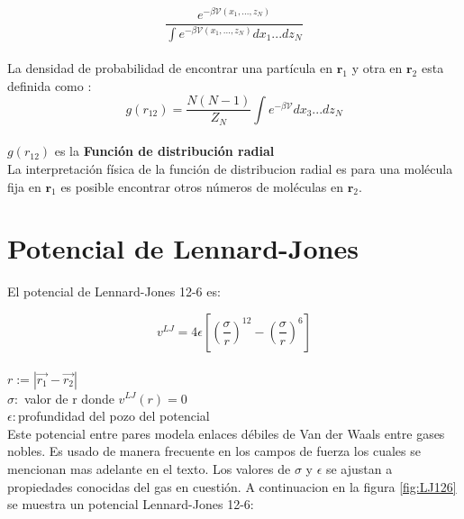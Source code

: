 \begin{equation}
    \frac{e^{-\beta \mathcal{V}(x_1,...,z_N)}}{\int e^{-\beta \mathcal{V}(x_1,...,z_N)}dx_1...dz_N}
\end{equation}\\

La densidad de probabilidad de encontrar una partícula en $\mathbf{r}_1$ y otra en $\mathbf{r}_2$ esta definida como \cite{feynman1972statistical}:\\

\begin{equation}
    g(r_{12}) = \frac{N(N-1)}{Z_N}
    \int e^{-\beta\mathcal{V}}dx_3...dz_N
\end{equation}\\

$g(r_{12})$ es la \textbf{Función de distribución radial}\\

La interpretación física de la función de distribucion radial es para una molécula fija en $\mathbf{r}_1$ es posible encontrar otros números de moléculas en $\mathbf{r}_2$.

\section{Potencial de Lennard-Jones}

El potencial de Lennard-Jones 12-6 es:

\begin{equation} \label{LJ12-6}
    v^{LJ} = 4\epsilon \left[ \left(\frac{\sigma}{r} \right)^{12}-\left(\frac{\sigma}{r} \right)^{6}\right]
\end{equation}\\

$r:= |\vec{r_1}-\vec{r_2}|$\\

$\sigma: $ valor de r donde $v^{LJ}(r)=0$\\

$\epsilon : $profundidad del pozo del potencial\\

Este potencial entre pares modela enlaces débiles de Van der Waals entre gases nobles. Es usado de manera frecuente en los campos de fuerza los cuales se mencionan mas adelante en el texto. Los valores de $\sigma$ y $\epsilon$ se ajustan a propiedades conocidas del gas en cuestión. A continuacion en la figura \ref{fig:LJ126} se muestra un potencial Lennard-Jones 12-6:\\

